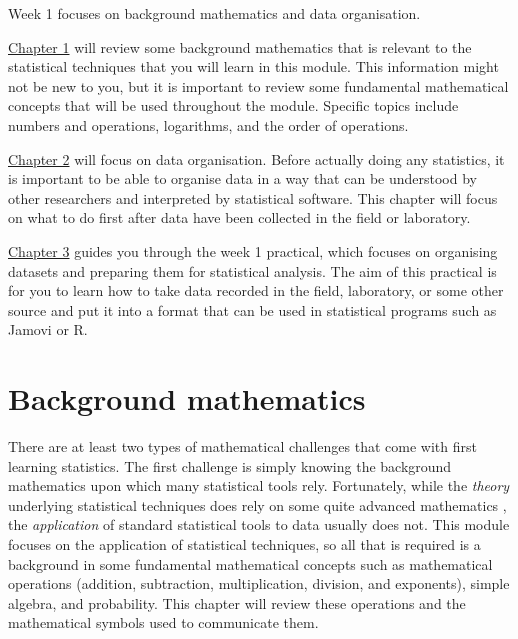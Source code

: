 \documentclass[
]{scrbook}
\begin{document}
Week 1 focuses on background mathematics and data organisation.

\protect\hyperlink{Chapter_1}{Chapter 1} will review some background mathematics that is relevant to the statistical techniques that you will learn in this module.
This information might not be new to you, but it is important to review some fundamental mathematical concepts that will be used throughout the module.
Specific topics include numbers and operations, logarithms, and the order of operations.

\protect\hyperlink{Chapter_2}{Chapter 2} will focus on data organisation.
Before actually doing any statistics, it is important to be able to organise data in a way that can be understood by other researchers and interpreted by statistical software.
This chapter will focus on what to do first after data have been collected in the field or laboratory.

\protect\hyperlink{Chapter_3}{Chapter 3} guides you through the week 1 practical, which focuses on organising datasets and preparing them for statistical analysis.
The aim of this practical is for you to learn how to take data recorded in the field, laboratory, or some other source and put it into a format that can be used in statistical programs such as Jamovi or R.

\hypertarget{Chapter_1}{%
\chapter{Background mathematics}\label{Chapter_1}}

There are at least two types of mathematical challenges that come with first learning statistics.
The first challenge is simply knowing the background mathematics upon which many statistical tools rely.
Fortunately, while the \emph{theory} underlying statistical techniques does rely on some quite advanced mathematics \citep[e.g., see][]{Mclean1991, Rencher2000, Miller2004}, the \emph{application} of standard statistical tools to data usually does not.
This module focuses on the application of statistical techniques, so all that is required is a background in some fundamental mathematical concepts such as mathematical operations (addition, subtraction, multiplication, division, and exponents), simple algebra, and probability.
This chapter will review these operations and the mathematical symbols used to communicate them.
\end{document}
